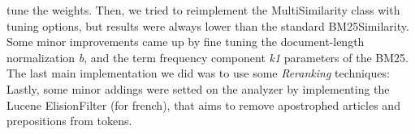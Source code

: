 tune the weights. Then, we tried to reimplement the MultiSimilarity class with tuning options, but results were always lower than the standard BM25Similarity. Some minor improvements came up by fine tuning the document-length
normalization \textit{b}, and the term frequency component \textit{k1} parameters of the BM25.
The last main implementation we did was to use some \textit{Reranking} techniques: 
Lastly, some minor addings were setted on the analyzer by implementing the Lucene ElisionFilter (for french), that aims to remove apostrophed articles and prepositions from tokens.
    